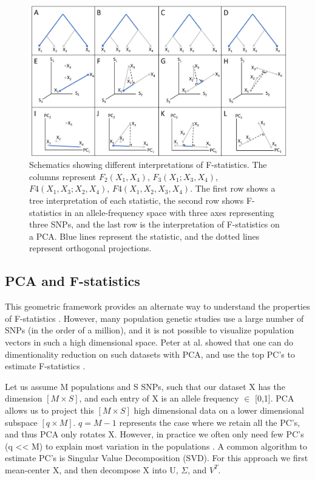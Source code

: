 \documentclass[12pt, letterpaper]{article}
\begin{document}
\begin{figure}[ht!]
    \includegraphics[width=16.5cm]{ppt/overview.png}
    \centering
    \caption{Schematics showing different interpretations of F-statistics. The columns represent $F_2(X_1,X_4)$, $F_3(X_1;X_3,X_4)$, $F4(X_1,X_3;X_2,X_4)$, $F4(X_1,X_2,X_3,X_4)$. The first row shows a tree interpretation of each statistic, the second row shows F-statistics in an allele-frequency space with three axes representing three SNPs, and the last row is the interpretation of F-statistics on a PCA. Blue lines represent the statistic, and the dotted lines represent orthogonal projections.}
    \label{fig2:overview}
\end{figure}


\subsection{PCA and F-statistics}

This geometric framework provides an alternate way to understand the properties of F-statistics \cite{oteo-garcia_geometrical_2021}. However, many population genetic studies use a large number of SNPs (in the order of a million), and it is not possible to visualize population vectors in such a high dimensional space. Peter at al. showed that one can do dimentionality reduction on such datasets with PCA, and use the top PC's to estimate F-statistics \cite{peter_geometric_2022}.

Let us assume M populations and S SNPs, such that our dataset X has the dimension $[M \times S]$, and each entry of X is an allele frequency $\in$ [0,1]. PCA allows us to project this $[M \times S]$ high dimensional data on a lower dimensional subspace $[q \times M]$. $q = M-1$ represents the case where we retain all the PC's, and thus PCA only rotates X. However, in practice we often only need few PC's (q << M) to explain most variation in the populations \cite{peter_geometric_2022}. A common algorithm to estimate PC's is Singular Value Decomposition (SVD). For this approach we first mean-center X, and then decompose X into U, $\Sigma$, and $V^T$.
\end{document}

